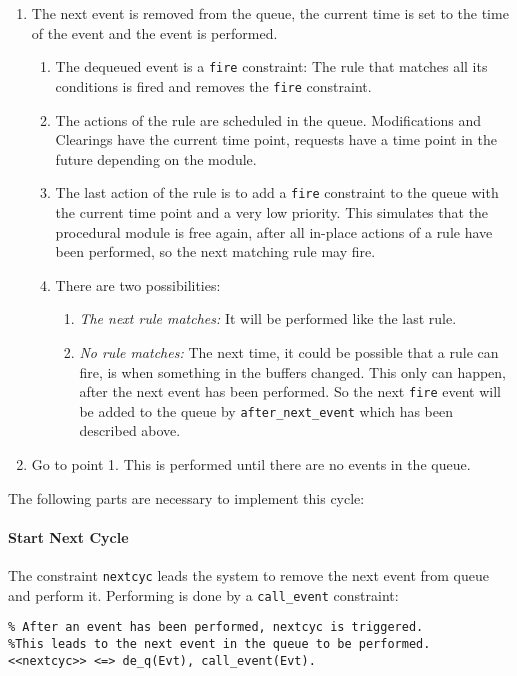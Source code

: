 \begin{enumerate}
 \item The next event is removed from the queue, the current time is set to the time of the event and the event is performed.
 \begin{enumerate}
 \item The dequeued event is a \lstinline|fire| constraint: The rule that matches all its conditions is fired and removes the \lstinline|fire| constraint.
 \item The actions of the rule are scheduled in the queue. Modifications and Clearings have the current time point, requests have a time point in the future depending on the module.
 \item The last action of the rule is to add a \lstinline|fire| constraint to the queue with the current time point and a very low priority. This simulates that the procedural module is free again, after all in-place actions of a rule have been performed, so the next matching rule may fire.
 \item There are two possibilities:
 \begin{enumerate}
  \item \emph{The next rule matches:} It will be performed like the last rule.
  \item \emph{No rule matches:} The next time, it could be possible that a rule can fire, is when something in the buffers changed. This only can happen, after the next event has been performed. So the next \lstinline|fire| event will be added to the queue by \lstinline|after_next_event| which has been described above.
 \end{enumerate}
  \end{enumerate}
 \item Go to point 1. This is performed until there are no events in the queue.
\end{enumerate}


The following parts are necessary to implement this cycle:

\paragraph{Start Next Cycle} 

The constraint \lstinline|nextcyc| leads the system to remove the next event from queue and perform it. Performing is done by a \lstinline|call_event| constraint:

\begin{lstlisting}
% After an event has been performed, nextcyc is triggered. 
%This leads to the next event in the queue to be performed.
<<nextcyc>> <=> de_q(Evt), call_event(Evt).
\end{lstlisting}


